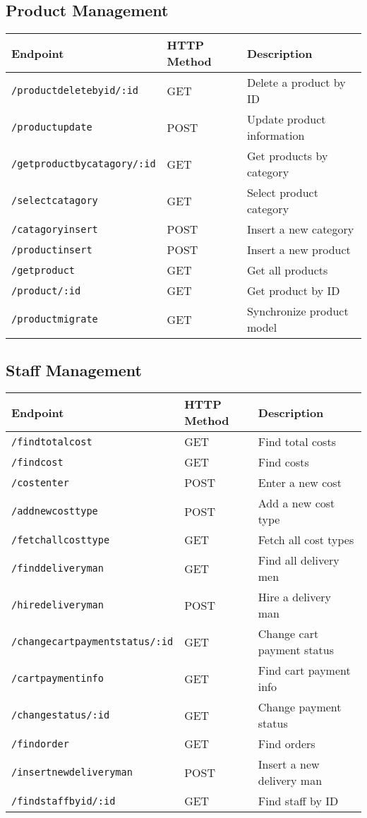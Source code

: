 \subsection*{Product Management}
    \begin{tabular}{|l|l|p{8cm}|}
        \hline
        \textbf{Endpoint} & \textbf{HTTP Method} & \textbf{Description} \\ \hline
        \texttt{/productdeletebyid/:id} & GET & Delete a product by ID \\ \hline
        \texttt{/productupdate} & POST & Update product information \\ \hline
        \texttt{/getproductbycatagory/:id} & GET & Get products by category \\ \hline
        \texttt{/selectcatagory} & GET & Select product category \\ \hline
        \texttt{/catagoryinsert} & POST & Insert a new category \\ \hline
        \texttt{/productinsert} & POST & Insert a new product \\ \hline
        \texttt{/getproduct} & GET & Get all products \\ \hline
        \texttt{/product/:id} & GET & Get product by ID \\ \hline
        \texttt{/productmigrate} & GET & Synchronize product model \\ \hline
    \end{tabular}


\subsection*{Staff Management}
\begin{tabular}{|l|l|p{8cm}|}
\hline
\textbf{Endpoint} & \textbf{HTTP Method} & \textbf{Description} \\ \hline
\texttt{/findtotalcost} & GET & Find total costs \\ \hline
\texttt{/findcost} & GET & Find costs \\ \hline
\texttt{/costenter} & POST & Enter a new cost \\ \hline
\texttt{/addnewcosttype} & POST & Add a new cost type \\ \hline
\texttt{/fetchallcosttype} & GET & Fetch all cost types \\ \hline
\texttt{/finddeliveryman} & GET & Find all delivery men \\ \hline
\texttt{/hiredeliveryman} & POST & Hire a delivery man \\ \hline
\texttt{/changecartpaymentstatus/:id} & GET & Change cart payment status \\ \hline
\texttt{/cartpaymentinfo} & GET & Find cart payment info \\ \hline
\texttt{/changestatus/:id} & GET & Change payment status \\ \hline
\texttt{/findorder} & GET & Find orders \\ \hline
\texttt{/insertnewdeliveryman} & POST & Insert a new delivery man \\ \hline
\texttt{/findstaffbyid/:id} & GET & Find staff by ID \\ \hline
\end{tabular}

